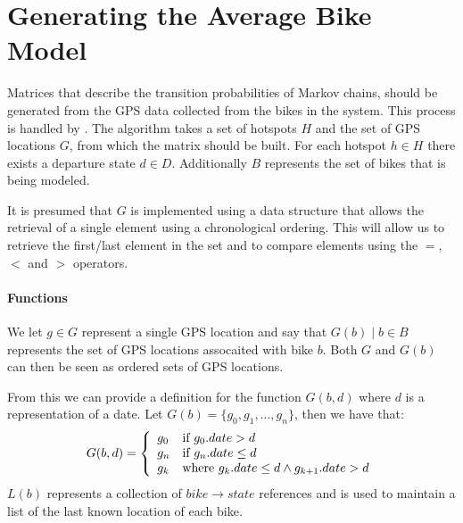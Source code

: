 \section{Generating the Average Bike Model} \label{markov:create_model}
Matrices that describe the transition probabilities of Markov chains, should be generated from the GPS data collected from the bikes in the system.
This process is handled by .
The algorithm takes a set of hotspots $H$ and the set of GPS locations $G$, from which the matrix should be built.
For each hotspot $h \in H$ there exists a departure state $d \in D$.
Additionally $B$ represents the set of bikes that is being modeled.

It is presumed that $G$ is implemented using a data structure that allows the retrieval of a single element using a chronological ordering.
This will allow us to retrieve the first/last element in the set and to compare elements using the $=$, $<$ and $>$ operators.

\paragraph{Functions}
We let $g \in G$ represent a single GPS location and say that $G(b) \mid b \in B$ represents the set of GPS locations assocaited with bike $b$.
Both $G$ and $G(b)$ can then be seen as ordered sets of GPS locations.

From this we can provide a definition for the function $G(b, d)$ where $d$ is a representation of a date.
Let $G(b) = \{g_0, g_1, \dots, g_n\}$, then we have that:
\begin{equation}
G(b, d) = 
\left\{
  \begin{array}{l l}
    g_0 & \text{if $g_0.date > d$}\\
    g_n & \text{if $g_n.date \leq d$}\\
    g_k & \text{where $g_k.date \leq d \wedge g_{k+1}.date > d$}
  \end{array} \right.
\end{equation}
$L(b)$ represents a collection of $bike \rightarrow state$ references and is used to maintain a list of the last known location of each bike.

